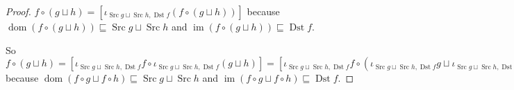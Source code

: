 \begin{proof}
$f \circ (g \sqcup h) = [\iota_{\operatorname{Src} g \sqcup \operatorname{Src} h, \operatorname{Dst}
	f} (f \circ (g \sqcup h))]$ because $\operatorname{dom} (f \circ (g \sqcup h))
\sqsubseteq \operatorname{Src} g \sqcup \operatorname{Src} h$ and $\operatorname{im} (f \circ (g
\sqcup h)) \sqsubseteq \operatorname{Dst} f$.

So $f \circ (g \sqcup h) = [\iota_{\operatorname{Src} g \sqcup \operatorname{Src} h,
	\operatorname{Dst} f} f \circ \iota_{\operatorname{Src} g \sqcup \operatorname{Src} h, \operatorname{Dst} f}
(g \sqcup h)] = [\iota_{\operatorname{Src} g \sqcup \operatorname{Src} h, \operatorname{Dst} f} f
\circ (\iota_{\operatorname{Src} g \sqcup \operatorname{Src} h, \operatorname{Dst} f} g \sqcup
\iota_{\operatorname{Src} g \sqcup \operatorname{Src} h, \operatorname{Dst} f} h)] =
[\iota_{\operatorname{Src} g \sqcup \operatorname{Src} h, \operatorname{Dst} f} f \circ
\iota_{\operatorname{Src} g \sqcup \operatorname{Src} h, \operatorname{Dst} f} g \sqcup
\iota_{\operatorname{Src} g \sqcup \operatorname{Src} h, \operatorname{Dst} f} f \circ
\iota_{\operatorname{Src} g \sqcup \operatorname{Src} h, \operatorname{Dst} f} h] =
[\iota_{\operatorname{Src} g \sqcup \operatorname{Src} h, \operatorname{Dst} f} (f \circ g) \sqcup
\iota_{\operatorname{Src} g \sqcup \operatorname{Src} h, \operatorname{Dst} f} (f \circ h)] =
[\iota_{\operatorname{Src} g \sqcup \operatorname{Src} h, \operatorname{Dst} f} (f \circ g \sqcup f
\circ h)] = f \circ g \sqcup f \circ h$ because $\operatorname{dom} (f \circ g
\sqcup f \circ h) \sqsubseteq \operatorname{Src} g \sqcup \operatorname{Src} h$ and
$\operatorname{im} (f \circ g \sqcup f \circ h) \sqsubseteq \operatorname{Dst} f$.
\end{proof}
